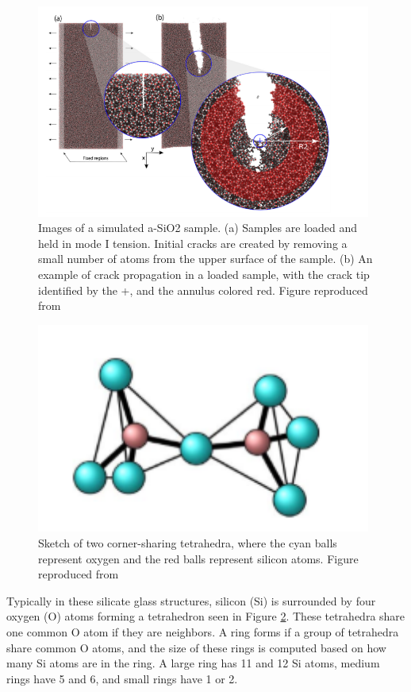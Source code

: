 \begin{figure}[!b]
  \centering
  \includegraphics[width=11cm]{picture/FractureMechanism.PNG}
  \caption{Images of a simulated a-SiO2 sample. (a) Samples are loaded and held in mode I tension. Initial cracks are created by removing a
small number of atoms from the upper surface of the sample. (b) An example of crack propagation in a loaded sample, with the crack tip
identified by the +, and the annulus colored red. Figure reproduced from~\protect\cite{mWilson_continuum_stress}} 
  \label{crack_prop}
\end{figure}


\begin{figure}[!b]
  \centering
  \includegraphics[width=11cm]{picture/tetrahedra.PNG}
  \caption{Sketch of two corner-sharing tetrahedra, where the cyan balls represent oxygen
and the red balls represent silicon atoms.
Figure reproduced from~\protect\cite{ebrahem2018influence}} 
  \label{tetrahedra}
\end{figure}




Typically in these silicate glass structures, silicon (Si) is surrounded by four oxygen (O) atoms forming a tetrahedron seen in Figure \ref{tetrahedra}. These tetrahedra share one common O atom if they are neighbors. A ring forms if a group of tetrahedra share common O atoms, and the size of these rings is computed based on how many Si atoms are in the ring. A large ring has 11 and 12 Si atoms, medium rings have 5 and 6, and small rings have 1 or 2.

